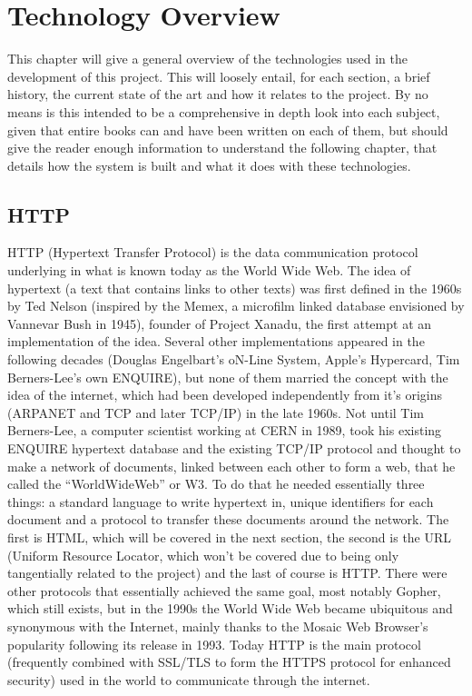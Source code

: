 \chapter{Technology Overview}
This chapter will give a general overview of the technologies used in the development of this project. 
This will loosely entail, for each section, a brief history, the current state of the art and how it relates 
to the project. By no means is this intended to be a comprehensive in depth look into each subject, given that 
entire books can and have been written on each of them, but should give the reader enough information to understand 
the following chapter, that details how the system is built and what it does with these technologies.
\section{HTTP}

HTTP (Hypertext Transfer Protocol) is the data communication protocol underlying in what is known today as the World
Wide Web. The idea of hypertext (a text that contains links to other texts) was first defined in the 1960s by Ted
Nelson (inspired by the Memex, a microfilm linked database envisioned by Vannevar Bush in 1945), founder of Project
Xanadu, the first attempt at an implementation of the idea. Several other implementations appeared in the following
decades (Douglas Engelbart's oN-Line System, Apple's Hypercard, Tim Berners-Lee's own ENQUIRE), but none of them
married the concept with the idea of the internet, which had been developed independently from it's origins (ARPANET
and TCP and later TCP/IP) in the late 1960s. Not until Tim Berners-Lee, a computer scientist working at CERN in 1989,
took his existing ENQUIRE hypertext database and the existing TCP/IP protocol and thought to make a network of
documents, linked between each other to form a web, that he called the ``WorldWideWeb'' or W3. To do that he needed
essentially three things: a standard language to write hypertext in, unique identifiers for each document and a
protocol to transfer these documents around the network. The first is HTML, which will be covered in the next section,
the second is the URL (Uniform Resource Locator, which won't be covered due to being only tangentially related to the
project) and the last of course is HTTP. There were other protocols that essentially achieved the same goal, most
notably Gopher, which still exists, but in the 1990s the World Wide Web became ubiquitous and synonymous with the
Internet, mainly thanks to the Mosaic Web Browser's popularity following its release in 1993. Today HTTP is the main
protocol (frequently combined with SSL/TLS to form the HTTPS protocol for enhanced security) used in the world to
communicate through the internet.\\

